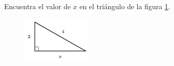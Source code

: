 \question[15]  Encuentra el valor de $x$ en el triángulo de la figura \ref{fig:lados_pitagoras_39}.
\begin{figure}[H]
    \begin{center}
        \includegraphics[width=0.3\textwidth]{../images/lados_pitagoras_39.png}
    \end{center}
    \caption{}
    \label{fig:lados_pitagoras_39}
\end{figure}